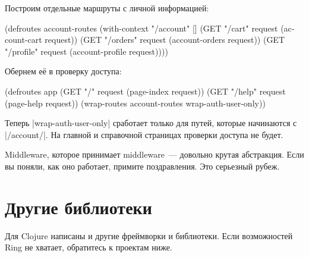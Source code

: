 
Построим отдельные маршруты с личной информацией:

\begin{english}
  \begin{clojure}
(defroutes account-routes
  (with-context "/account" []
    (GET "/cart" request (account-cart request))
    (GET "/orders" request (account-orders request))
    (GET "/profile" request (account-profile request))))
  \end{clojure}
\end{english}

\noindent
Обернем е\"{е} в проверку доступа:

\begin{english}
  \begin{clojure}
(defroutes app
  (GET "/" request (page-index request))
  (GET "/help" request (page-help request))
  (wrap-routes account-routes wrap-auth-user-only))
  \end{clojure}
\end{english}


Теперь \spverb|wrap-auth-user-only| сработает только для путей, которые
начинаются с \spverb|/account/|. На главной и справочной страницах проверки
доступа не будет.

Middleware, которое принимает middleware~--- довольно крутая абстракция. Если вы
поняли, как оно работает, примите поздравления. Это серьезный рубеж.

\section{Другие библиотеки}

Для Clojure написаны и другие фреймворки и библиотеки. Если возможностей Ring не
хватает, обратитесь к проектам ниже.

